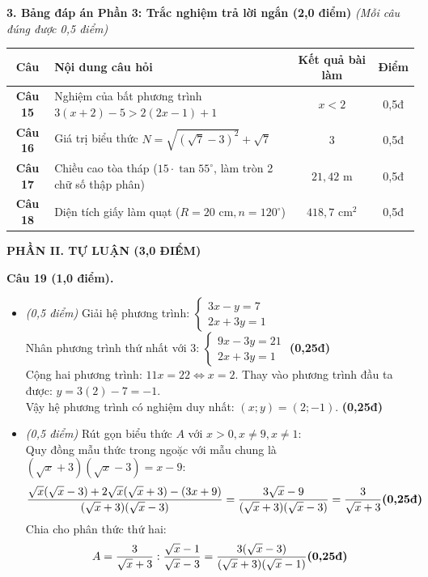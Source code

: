 \documentclass[11pt,a4paper]{article}
\begin{document}
\vspace{2mm}
\noindent
\textbf{3. Bảng đáp án Phần 3: Trắc nghiệm trả lời ngắn (2,0 điểm)} \textit{(Mỗi câu đúng được 0,5 điểm)}
\begin{center}
\begin{tabular}{|c|l|c|c|}
\hline
\textbf{Câu} & \textbf{Nội dung câu hỏi} & \textbf{Kết quả bài làm} & \textbf{Điểm} \\
\hline
\textbf{Câu 15} & Nghiệm của bất phương trình $3(x + 2) - 5 > 2(2x - 1) + 1$ & \textbf{$x < 2$} & 0,5đ \\
\hline
\textbf{Câu 16} & Giá trị biểu thức $N = \sqrt{(\sqrt{7}-3)^2} + \sqrt{7}$ & \textbf{$3$} & 0,5đ \\
\hline
\textbf{Câu 17} & Chiều cao tòa tháp ($15 \cdot \tan 55^\circ$, làm tròn 2 chữ số thập phân) & \textbf{$21{,}42\text{ m}$} & 0,5đ \\
\hline
\textbf{Câu 18} & Diện tích giấy làm quạt ($R = 20\text{ cm}, n = 120^\circ$) & \textbf{$418{,}7\text{ cm}^2$} & 0,5đ \\
\hline
\end{tabular}
\end{center}

\vspace{3mm}
\noindent
\textbf{\large PHẦN II. TỰ LUẬN (3,0 ĐIỂM)}

\vspace{2mm}
\textbf{Câu 19 (1,0 điểm).}
\begin{itemize}
  \item[a)] \textit{(0,5 điểm)} Giải hệ phương trình: $\begin{cases} 3x - y = 7 \\ 2x + 3y = 1 \end{cases}$\\
  Nhân phương trình thứ nhất với 3: $\begin{cases} 9x - 3y = 21 \\ 2x + 3y = 1 \end{cases}$ \hfill \textbf{(0,25đ)}\\
  Cộng hai phương trình: $11x = 22 \Leftrightarrow x = 2$. Thay vào phương trình đầu ta được: $y = 3(2) - 7 = -1$.\\
  Vậy hệ phương trình có nghiệm duy nhất: $(x; y) = (2; -1)$. \hfill \textbf{(0,25đ)}

  \item[b)] \textit{(0,5 điểm)} Rút gọn biểu thức $A$ với $x > 0, x \ne 9, x \ne 1$:\\
  Quy đồng mẫu thức trong ngoặc với mẫu chung là $(\sqrt{x}+3)(\sqrt{x}-3) = x - 9$:
  \[
  \dfrac{\sqrt{x}(\sqrt{x}-3) + 2\sqrt{x}(\sqrt{x}+3) - (3x+9)}{(\sqrt{x}+3)(\sqrt{x}-3)} = \dfrac{3\sqrt{x}-9}{(\sqrt{x}+3)(\sqrt{x}-3)} = \dfrac{3}{\sqrt{x}+3} \hfill \textbf{(0,25đ)}
  \]
  Chia cho phân thức thứ hai:
  \[
  A = \dfrac{3}{\sqrt{x}+3} : \dfrac{\sqrt{x}-1}{\sqrt{x}-3} = \dfrac{3(\sqrt{x}-3)}{(\sqrt{x}+3)(\sqrt{x}-1)} \hfill \textbf{(0,25đ)}
  \]
\end{itemize}
\end{document}
